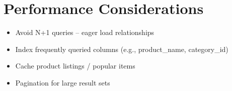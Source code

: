 \documentclass[12pt,a4paper]{article}
\begin{document}
\section{Performance Considerations}

\begin{itemize}[nosep]
    \item Avoid N+1 queries – eager load relationships
    \item Index frequently queried columns (e.g., product\_name, category\_id)
    \item Cache product listings / popular items
    \item Pagination for large result sets
\end{itemize}

\end{document}
